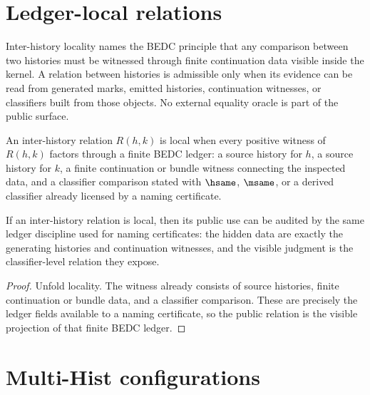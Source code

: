 \section{Ledger-local relations}
\label{sec:inter-hist-ledger-local-relations}

Inter-history locality names the BEDC principle that any comparison between two histories must be witnessed through finite continuation data visible inside the kernel. A relation between histories is admissible only when its evidence can be read from generated marks, emitted histories, continuation witnesses, or classifiers built from those objects. No external equality oracle is part of the public surface.

\begin{definition}
\label{def:inter-hist-locality}
An inter-history relation \(R(h,k)\) is local when every positive witness of \(R(h,k)\) factors through a finite BEDC ledger: a source history for \(h\), a source history for \(k\), a finite continuation or bundle witness connecting the inspected data, and a classifier comparison stated with \(\hsame\), \(\msame\), or a derived classifier already licensed by a naming certificate.
\end{definition}

\begin{theorem}
\label{thm:inter-hist-locality-ledger-visibility}
If an inter-history relation is local, then its public use can be audited by the same ledger discipline used for naming certificates: the hidden data are exactly the generating histories and continuation witnesses, and the visible judgment is the classifier-level relation they expose.
\end{theorem}
\begin{proof}
Unfold locality. The witness already consists of source histories, finite continuation or bundle data, and a classifier comparison. These are precisely the ledger fields available to a naming certificate, so the public relation is the visible projection of that finite BEDC ledger.
\end{proof}

\section{Multi-Hist configurations}
\label{sec:multi-hist-config}

